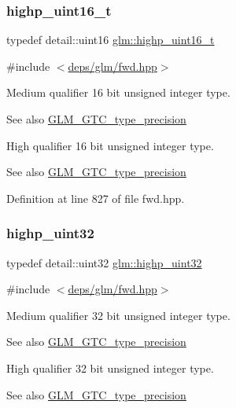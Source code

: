 \subsubsection{\texorpdfstring{highp\+\_\+uint16\+\_\+t}{highp\_uint16\_t}}
{\footnotesize\ttfamily typedef detail\+::uint16 \hyperlink{group__gtc__type__precision_ga3145bc0ee80432c165e985a188a722b3}{glm\+::highp\+\_\+uint16\+\_\+t}}



{\ttfamily \#include $<$\hyperlink{fwd_8hpp}{deps/glm/fwd.\+hpp}$>$}

Medium qualifier 16 bit unsigned integer type. \begin{DoxySeeAlso}{See also}
\hyperlink{group__gtc__type__precision}{G\+L\+M\+\_\+\+G\+T\+C\+\_\+type\+\_\+precision}
\end{DoxySeeAlso}
High qualifier 16 bit unsigned integer type. \begin{DoxySeeAlso}{See also}
\hyperlink{group__gtc__type__precision}{G\+L\+M\+\_\+\+G\+T\+C\+\_\+type\+\_\+precision} 
\end{DoxySeeAlso}


Definition at line 827 of file fwd.\+hpp.

\mbox{\label{group__gtc__type__precision_ga3145e44c73e2df7dfe4f3cb65974bf22}} 
\subsubsection{\texorpdfstring{highp\+\_\+uint32}{highp\_uint32}}
{\footnotesize\ttfamily typedef detail\+::uint32 \hyperlink{group__gtc__type__precision_ga3145e44c73e2df7dfe4f3cb65974bf22}{glm\+::highp\+\_\+uint32}}



{\ttfamily \#include $<$\hyperlink{fwd_8hpp}{deps/glm/fwd.\+hpp}$>$}

Medium qualifier 32 bit unsigned integer type. \begin{DoxySeeAlso}{See also}
\hyperlink{group__gtc__type__precision}{G\+L\+M\+\_\+\+G\+T\+C\+\_\+type\+\_\+precision}
\end{DoxySeeAlso}
High qualifier 32 bit unsigned integer type. \begin{DoxySeeAlso}{See also}
\hyperlink{group__gtc__type__precision}{G\+L\+M\+\_\+\+G\+T\+C\+\_\+type\+\_\+precision} 
\end{DoxySeeAlso}


